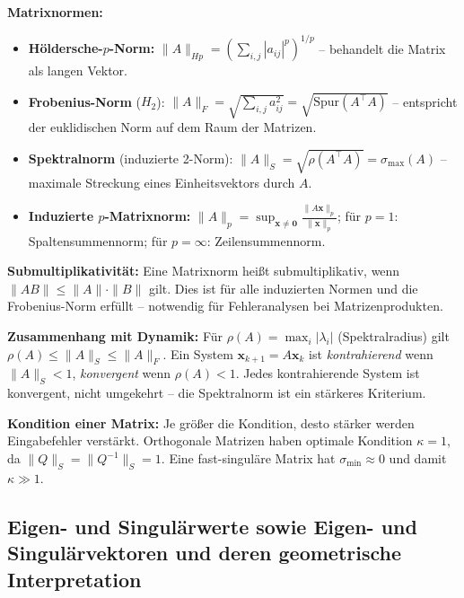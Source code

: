 \textbf{Matrixnormen:}
\begin{itemize}[leftmargin=1.5em]
    \item \textbf{Höldersche-$p$-Norm:} $\|A\|_{Hp} = \left(\sum_{i,j}|a_{ij}|^p\right)^{1/p}$ -- behandelt die Matrix als langen Vektor.
    \item \textbf{Frobenius-Norm} ($H_2$): $\|A\|_F = \sqrt{\sum_{i,j} a_{ij}^2} = \sqrt{\mathrm{Spur}(A^\top A)}$ -- entspricht der euklidischen Norm auf dem Raum der Matrizen.
    \item \textbf{Spektralnorm} (induzierte 2-Norm): $\|A\|_S = \sqrt{\rho(A^\top A)} = \sigma_{\max}(A)$ -- maximale Streckung eines Einheitsvektors durch $A$.
    \item \textbf{Induzierte $p$-Matrixnorm:} $\|A\|_p = \sup_{\bm{x}\neq\bm{0}} \frac{\|A\bm{x}\|_p}{\|\bm{x}\|_p}$; für $p=1$: Spaltensummennorm; für $p=\infty$: Zeilensummennorm.
\end{itemize}

\textbf{Submultiplikativität:} Eine Matrixnorm heißt submultiplikativ, wenn $\|AB\| \leq \|A\|\cdot\|B\|$ gilt. Dies ist für alle induzierten Normen und die Frobenius-Norm erfüllt -- notwendig für Fehleranalysen bei Matrizenprodukten.

\textbf{Zusammenhang mit Dynamik:} Für $\rho(A) = \max_i |\lambda_i|$ (Spektralradius) gilt $\rho(A) \leq \|A\|_S \leq \|A\|_F$. Ein System $\bm{x}_{k+1} = A\bm{x}_k$ ist \emph{kontrahierend} wenn $\|A\|_S < 1$, \emph{konvergent} wenn $\rho(A) < 1$. Jedes kontrahierende System ist konvergent, nicht umgekehrt -- die Spektralnorm ist ein stärkeres Kriterium.

\textbf{Kondition einer Matrix:}
Je größer die Kondition, desto stärker werden Eingabefehler verstärkt. Orthogonale Matrizen haben optimale Kondition $\kappa = 1$, da $\|Q\|_S = \|Q^{-1}\|_S = 1$. Eine fast-singuläre Matrix hat $\sigma_{\min} \approx 0$ und damit $\kappa \gg 1$.

\newpage

\subsection{Eigen- und Singulärwerte sowie Eigen- und Singulärvektoren und deren geometrische Interpretation}


